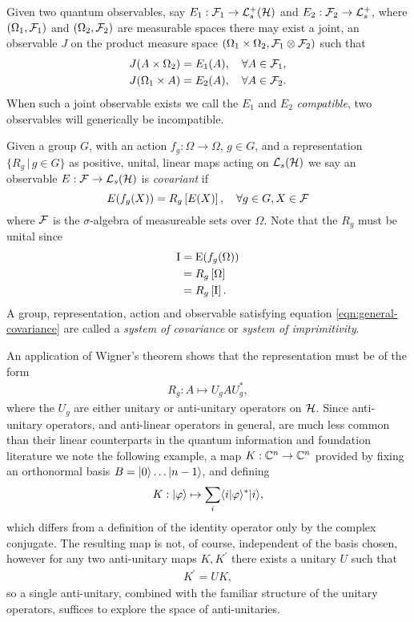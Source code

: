 Given two quantum observables, say $E_1:\fcal_1\to\posops[\hcal]$ and $E_2:\fcal_2\to\posops$, where $(\Omega_1, \mathcal{F}_1)$ and $(\Omega_2,\mathcal{F}_2)$ are measurable spaces there may exist a joint, an observable $J$ on the product measure space $(\Omega_1\times\Omega_2, \mathcal{F}_1\otimes\mathcal{F}_2)$ such that
\begin{align}
  J(A \times\Omega_2) &= E_1(A), \quad \forall A\in\mathcal{F}_1,\\
  J(\Omega_1\times A) &= E_2(A), \quad \forall A\in\mathcal{F}_2.
\end{align}
When such a joint observable exists we call the $E_1$ and $E_2$ \emph{compatible}, two observables will generically be incompatible.

Given a group $G$, with an action $f_g:\Omega\to\Omega$, $g\in G$, and a representation $\{R_g\, | \, g\in G\}$ as positive, unital, linear maps acting on $\saops[\hcal]$ we say an observable $E:\fcal\to\saops[\hcal]$ is \emph{covariant} if
\begin{equation}\label{eqn:general-covariance}
  E(f_g(X)) = R_g \left[E(X)\right], \quad \forall g\in G, X\in\mathcal{F}
\end{equation}
where $\mathcal{F}$ is the $\sigma$-algebra of measureable sets over $\Omega$. Note that the $R_g$ must be unital since
\begin{align}
  \operatorname{I} &=  \operatorname{E}(f_g(\Omega))\\
       &= R_g\left[\Omega\right]\\
       &= R_g\left[\operatorname{I}\right].
\end{align}
A group, representation, action and observable satisfying equation \eqref{eqn:general-covariance} are called a \emph{system of covariance} or \emph{system of imprimitivity}.

An application of Wigner's theorem shows that the representation must be of the form
\begin{align}
  R_g:A\mapsto U_g A U_g^*,
\end{align}
where the $U_g$ are either unitary or anti-unitary operators on $\mathcal{H}$. Since anti-unitary operators, and anti-linear operators in general, are much less common than their linear counterparts in the quantum information and foundation literature we note the following example, a map $K:\mathbb{C}^n\to\mathbb{C}^n$ provided by fixing an orthonormal basis $B = | 0 \rangle\ldots | n-1 \rangle$, and defining
\begin{align}
  K: | \varphi \rangle \mapsto \sum_i \langle i|\varphi\rangle^* | i \rangle,
\end{align}
which differs from a definition of the identity operator only by the complex conjugate. The resulting map is not, of course, independent of the basis chosen, however for any two anti-unitary maps $K, K^\prime$ there exists a unitary $U$ such that
\begin{align}
  K^\prime = U K,
\end{align}
so a single anti-unitary, combined with the familiar structure of the unitary operators, suffices to explore the space of anti-unitaries.

